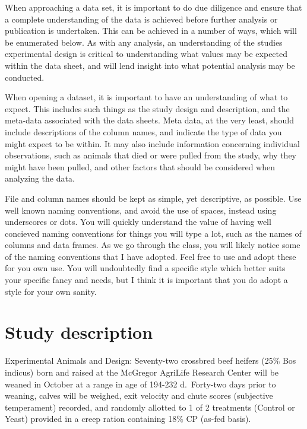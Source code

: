 \documentclass[
]{book}
\begin{document}
When approaching a data set, it is important to do due diligence and ensure that a complete understanding of the data is achieved before further analysis or publication is undertaken. This can be achieved in a number of ways, which will be enumerated below. As with any analysis, an understanding of the studies experimental design is critical to understanding what values may be expected within the data sheet, and will lend insight into what potential analysis may be conducted.

When opening a dataset, it is important to have an understanding of what to expect. This includes such things as the study design and description, and the meta-data associated with the data sheets. Meta data, at the very least, should include descriptions of the column names, and indicate the type of data you might expect to be within. It may also include information concerning individual observations, such as animals that died or were pulled from the study, why they might have been pulled, and other factors that should be considered when analyzing the data.

File and column names should be kept as simple, yet descriptive, as possible. Use well known naming conventions, and avoid the use of spaces, instead using underscores or dots. You will quickly understand the value of having well concieved naming conventions for things you will type a lot, such as the names of columns and data frames. As we go through the class, you will likely notice some of the naming conventions that I have adopted. Feel free to use and adopt these for you own use. You will undoubtedly find a specific style which better suits your specific fancy and needs, but I think it is important that you do adopt a style for your own sanity.

\section{Study description}\label{study-description}

Experimental Animals and Design: Seventy-two crossbred beef heifers (25\% Bos indicus) born and raised at the McGregor AgriLife Research Center will be weaned in October at a range in age of 194-232 d.~Forty-two days prior to weaning, calves will be weighed, exit velocity and chute scores (subjective temperament) recorded, and randomly allotted to 1 of 2 treatments (Control or Yeast) provided in a creep ration containing 18\% CP (as-fed basis).
\end{document}
